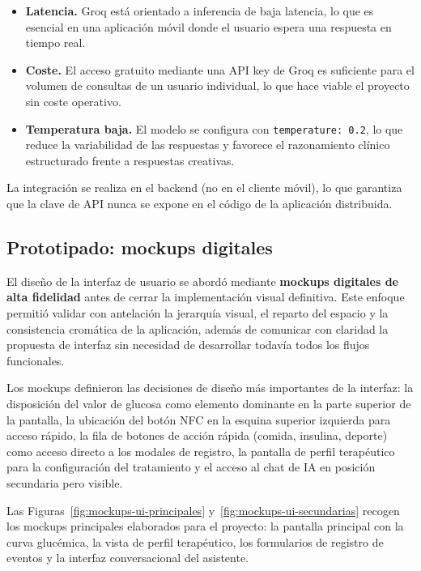 \begin{itemize}
    \item \textbf{Latencia.} Groq está orientado a inferencia de baja latencia,
          lo que es esencial en una aplicación móvil donde el usuario espera una
          respuesta en tiempo real.
    \item \textbf{Coste.} El acceso gratuito mediante una API key de Groq es suficiente para el
          volumen de consultas de un usuario individual, lo que hace viable el proyecto
          sin coste operativo.
    \item \textbf{Temperatura baja.} El modelo se configura con \texttt{temperature: 0.2},
          lo que reduce la variabilidad de las respuestas y favorece el razonamiento
          clínico estructurado frente a respuestas creativas.
\end{itemize}

La integración se realiza en el backend (no en el cliente móvil), lo que garantiza que
la clave de API nunca se expone en el código de la aplicación distribuida.

\subsection{Prototipado: mockups digitales}
\label{subsec:herramienta-prototipado}

El diseño de la interfaz de usuario se abordó mediante \textbf{mockups digitales de
alta fidelidad} antes de cerrar la implementación visual definitiva. Este enfoque
permitió validar con antelación la jerarquía visual, el reparto del espacio y la
consistencia cromática de la aplicación, además de comunicar con claridad la propuesta
de interfaz sin necesidad de desarrollar todavía todos los flujos funcionales.

Los mockups definieron las decisiones de diseño más importantes de la interfaz: la
disposición del valor de glucosa como elemento dominante en la parte superior de la
pantalla, la ubicación del botón NFC en la esquina superior izquierda para acceso rápido,
la fila de botones de acción rápida (comida, insulina, deporte) como acceso directo a
los modales de registro, la pantalla de perfil terapéutico para la configuración del
tratamiento y el acceso al chat de IA en posición secundaria pero visible.

Las Figuras~\ref{fig:mockups-ui-principales} y~\ref{fig:mockups-ui-secundarias}
recogen los mockups principales elaborados para el proyecto: la pantalla principal con
la curva glucémica, la vista de perfil terapéutico, los formularios de registro de
eventos y la interfaz conversacional del asistente.

